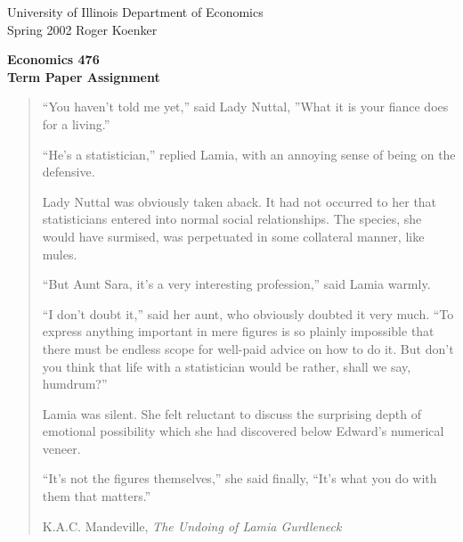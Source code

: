 \setlength{\textwidth}{170mm}
\setlength{\textheight}{220mm}
\setlength{\oddsidemargin}{0mm}
\setlength{\evensidemargin}{10mm}
\setlength{\topmargin}{-10mm}
\newcommand{\REF}{\nopagebreak\noindent{\large{\bf
      References}}\vspace{.2in}}

\newcommand{\Ref}[1]{\medskip\noindent\hangafter=1
      \hangindent=20pt\ignorespaces #1}
\pagestyle{empty}



\noindent
University of Illinois \hfill Department of Economics \\
Spring 2002 \hfill Roger Koenker

\begin{center}
\large{
{\bf Economics 476 \\
Term Paper Assignment}}
\end{center}

\vspace{5mm}
\begin{quotation}

``You haven't told me yet,'' said Lady Nuttal, ''What it is your fiance does for a living.''

``He's a statistician,'' replied Lamia, with an annoying sense of being on the defensive.

Lady Nuttal was obviously taken aback.  It had not occurred to her that statisticians 
entered into normal social relationships.  The species, she would have surmised, was perpetuated in some collateral manner, like mules.

``But Aunt Sara, it's a very interesting profession,'' said Lamia warmly.

``I don't doubt it,'' said her aunt, who obviously doubted it very much.  ``To 
express anything important in mere figures is so plainly impossible 
that there must be endless scope for well-paid advice on how to do it.  But 
don't you think that life with a statistician would be rather, shall we say, humdrum?''

Lamia was silent.  She felt reluctant to discuss the surprising depth of 
emotional possibility which she had discovered below Edward's numerical veneer.

``It's not the figures themselves,'' she said finally, ``It's what you do with them that matters.''

\hspace{45mm} K.A.C. Mandeville, {\em The Undoing of Lamia Gurdleneck}

\end{quotation}

